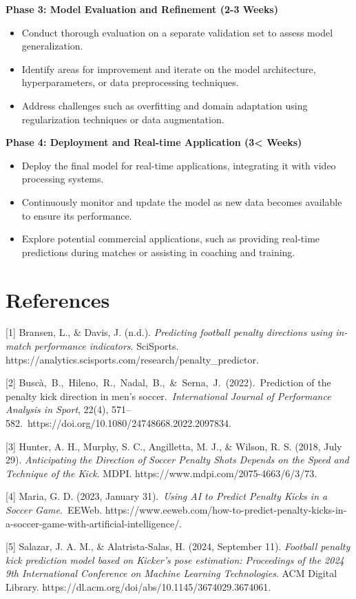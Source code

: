 \documentclass{article}
\begin{document}
{\bf{Phase 3: Model Evaluation and Refinement (2-3 Weeks)}}
\begin{itemize}
    \item Conduct thorough evaluation on a separate validation set to assess model generalization.
    \item Identify areas for improvement and iterate on the model architecture, hyperparameters, or data preprocessing techniques.
    \item Address challenges such as overfitting and domain adaptation using regularization techniques or data augmentation.
\end{itemize}

{\bf{Phase 4: Deployment and Real-time Application (3< Weeks)}}
\begin{itemize}
    \item Deploy the final model for real-time applications, integrating it with video processing systems.
    \item Continuously monitor and update the model as new data becomes available to ensure its performance.
    \item Explore potential commercial applications, such as providing real-time predictions during matches or assisting in coaching and training.
\end{itemize}

\section*{References}

\medskip

{
\small

[1] Bransen, L., \& Davis, J. (n.d.). {\it Predicting football penalty directions using in-match performance indicators}. SciSports. https://analytics.scisports.com/research/penalty\_predictor.

[2] Buscà,\ B.,\ Hileno,\ R.,\ Nadal,\ B.,\ \&\ Serna,\ J.\ (2022).\ Prediction of the penalty kick direction in men’s soccer.\ {\it International Journal of Performance Analysis in Sport}, 22(4), 571–582.\ https://doi.org/10.1080/24748668.2022.2097834.

[3] Hunter, A. H., Murphy, S. C., Angilletta, M. J., \& Wilson, R. S. (2018, July 29). {\it Anticipating the Direction of Soccer Penalty Shots Depends on the Speed and Technique of the Kick}. MDPI. https://www.mdpi.com/2075-4663/6/3/73.

[4] Maria, G. D. (2023, January 31).\ {\it Using AI to Predict Penalty Kicks in a Soccer Game}.\ EEWeb. https://www.eeweb.com/how-to-predict-penalty-kicks-in-a-soccer-game-with-artificial-intelligence/.

[5] Salazar, J. A. M., \& Alatrista-Salas, H. (2024, September 11).  {\it Football penalty kick prediction model based on Kicker’s pose estimation: Proceedings of the 2024 9th International Conference on Machine Learning Technologies}. ACM Digital Library. https://dl.acm.org/doi/abs/10.1145/3674029.3674061.

}
\end{document}
